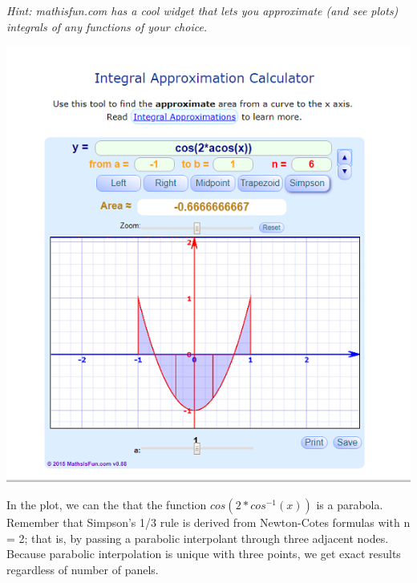 \begin{exercise}{2}
\textit{Hint: mathisfun.com has a cool widget that lets you approximate (and see plots) integrals of any functions of your choice.}

\includegraphics[]{cos(2acos(x)).png}


In the plot, we can the that the function \(cos(2*cos^{-1}(x))\) is a parabola. Remember that Simpson's 1/3 rule is derived from Newton-Cotes formulas with n = 2; that is, by passing a parabolic interpolant through three adjacent nodes. Because parabolic interpolation is unique with three points, we get exact results regardless of number of panels.
\end{exercise}


